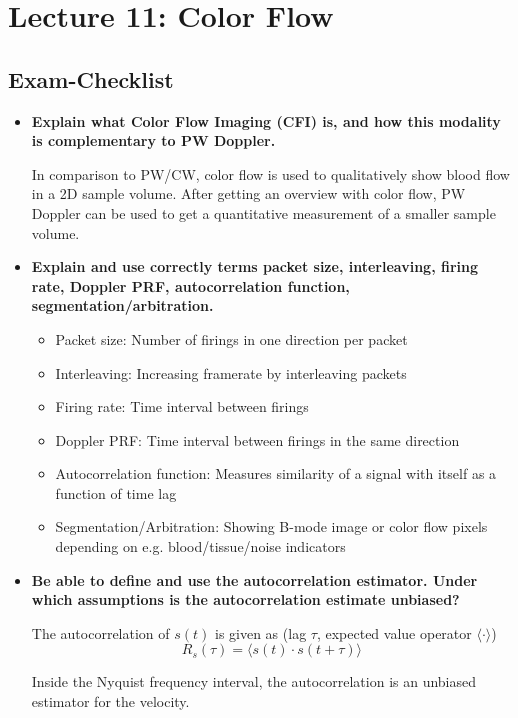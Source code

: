 \documentclass[10pt,a4paper,noendnumber=true]{scrartcl}
\begin{document}
\newpage
\section{Lecture 11: Color Flow}

\subsection{Exam-Checklist}
\begin{itemize}
\item \textbf{Explain what Color Flow Imaging (CFI) is, and how this modality is complementary to PW Doppler.}

In comparison to PW/CW, color flow is used to qualitatively show blood flow in a 2D sample volume. After getting an overview with color flow, PW Doppler can be used to get a quantitative measurement of a smaller sample volume.

\item \textbf{Explain and use correctly terms packet size, interleaving, firing rate, Doppler PRF, autocorrelation function, segmentation/arbitration.}
\begin{itemize}
\item Packet size: Number of firings in one direction per packet %
\item Interleaving: Increasing framerate by interleaving packets %
\item Firing rate: Time interval between firings
\item Doppler PRF: Time interval between firings in the same direction
\item Autocorrelation function: Measures similarity of a signal with itself as a function of time lag
\item Segmentation/Arbitration: Showing B-mode image or color flow pixels depending on e.g. blood/tissue/noise indicators
\end{itemize}

\item \textbf{Be able to define and use the autocorrelation estimator. Under which assumptions is the autocorrelation estimate unbiased?}

The autocorrelation of $s(t)$ is given as (lag $\tau$, expected value operator $\langle \cdot \rangle$)
\begin{equation}
R_s(\tau) = \langle s(t) \cdot s(t+\tau) \rangle
\end{equation}

Inside the Nyquist frequency interval, the autocorrelation is an unbiased estimator for the velocity.


\end{itemize}
\end{document}
